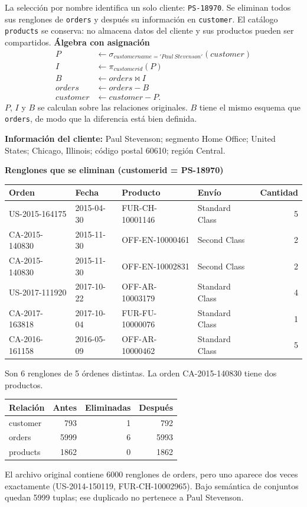 La selección por nombre identifica un solo cliente: \texttt{PS-18970}. Se eliminan todos sus renglones de \texttt{orders} y después su información en \texttt{customer}. El catálogo \texttt{products} se conserva: no almacena datos del cliente y sus productos pueden ser compartidos.
\textbf{Álgebra con asignación}
\begin{align*}
P &\leftarrow \sigma_{customername='Paul\ Stevenson'}(customer)\\
I &\leftarrow \pi_{customerid}(P)\\
B &\leftarrow orders\bowtie I\\
orders &\leftarrow orders-B\\
customer &\leftarrow customer-P.
\end{align*}
$P$, $I$ y $B$ se calculan sobre las relaciones originales. $B$ tiene el mismo esquema que \texttt{orders}, de modo que la diferencia está bien definida.

\textbf{Información del cliente:} Paul Stevenson; segmento Home Office; United States; Chicago, Illinois; código postal 60610; región Central.

\textbf{Renglones que se eliminan (customerid = PS-18970)}
\begin{center}\scriptsize\begin{tabular}{llllr}\toprule\rowcolor{Fondo} Orden & Fecha & Producto & Envío & Cantidad\\\midrule
US-2015-164175 & 2015-04-30 & FUR-CH-10001146 & Standard Class & 5\\
CA-2015-140830 & 2015-11-30 & OFF-EN-10000461 & Second Class & 2\\
CA-2015-140830 & 2015-11-30 & OFF-EN-10002831 & Second Class & 2\\
US-2017-111920 & 2017-10-22 & OFF-AR-10003179 & Standard Class & 4\\
CA-2017-163818 & 2017-10-04 & FUR-FU-10000076 & Standard Class & 1\\
CA-2016-161158 & 2016-05-09 & OFF-AR-10000462 & Standard Class & 5\\
\bottomrule\end{tabular}\end{center}
Son 6 renglones de 5 órdenes distintas. La orden CA-2015-140830 tiene dos productos.
\begin{center}\begin{tabular}{lrrr}\toprule\rowcolor{Fondo} Relación & Antes & Eliminadas & Después\\\midrule
customer & 793 & 1 & 792\\orders & 5999 & 6 & 5993\\products & 1862 & 0 & 1862\\\bottomrule\end{tabular}\end{center}
El archivo original contiene 6000 renglones de orders, pero uno aparece dos veces exactamente (US-2014-150119, FUR-CH-10002965). Bajo semántica de conjuntos quedan 5999 tuplas; ese duplicado no pertenece a Paul Stevenson.

